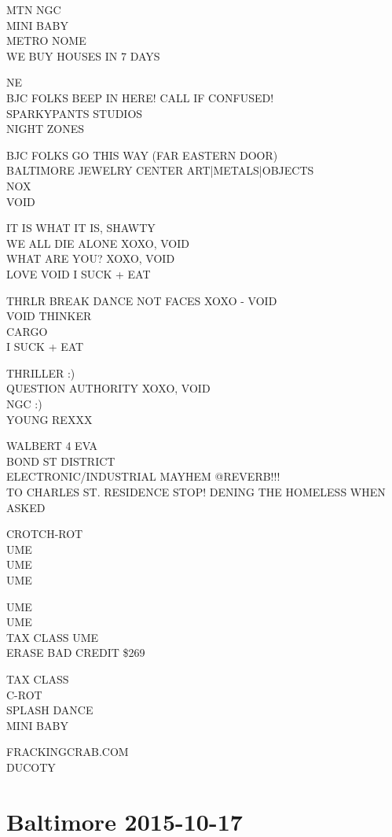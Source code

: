 \documentclass[10pt,letterpaper]{article}
\begin{document}
MTN NGC\\
MINI BABY\\
METRO NOME\\
WE BUY HOUSES IN 7 DAYS

NE\\
BJC FOLKS BEEP IN HERE! CALL IF CONFUSED!\\
SPARKYPANTS STUDIOS\\
NIGHT ZONES

BJC FOLKS GO THIS WAY (FAR EASTERN DOOR)\\
BALTIMORE JEWELRY CENTER ART|METALS|OBJECTS\\
NOX\\
VOID

IT IS WHAT IT IS, SHAWTY\\
WE ALL DIE ALONE XOXO, VOID\\
WHAT ARE YOU?  XOXO, VOID\\
LOVE VOID I SUCK + EAT

THRLR BREAK DANCE NOT FACES XOXO {-} VOID\\
VOID THINKER\\
CARGO\\
I SUCK + EAT

THRILLER :)\\
QUESTION AUTHORITY XOXO, VOID\\
NGC :)\\
YOUNG REXXX

WALBERT 4 EVA\\
BOND ST DISTRICT\\
ELECTRONIC/INDUSTRIAL MAYHEM @REVERB!!!\\
TO CHARLES ST. RESIDENCE STOP! DENING THE HOMELESS WHEN ASKED

CROTCH{-}ROT\\
UME\\
UME\\
UME

UME\\
UME\\
TAX CLASS UME\\
ERASE BAD CREDIT \$269

TAX CLASS\\
C{-}ROT\\
SPLASH DANCE\\
MINI BABY

FRACKINGCRAB.COM\\
DUCOTY


\section*{Baltimore 2015-10-17}
\end{document}
